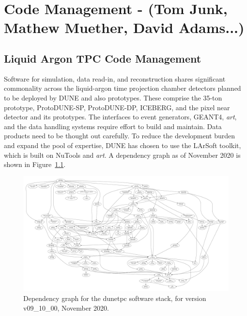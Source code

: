 \chapter{Code Management - (Tom Junk, Mathew Muether, David Adams...)}
\label{ch:codemgmt}

\section{Liquid Argon TPC Code Management}
\label{sec:codemgmt:dunetpc}  %

Software for simulation, data read-in, and reconstruction shares significant commonality across the liquid-argon time projection chamber detectors planned to be deployed by DUNE and also prototypes.  These comprise the 35-ton prototype, ProtoDUNE-SP, ProtoDUNE-DP, ICEBERG, and the pixel near detector and its prototypes.  The interfaces to event generators, GEANT4, {\it art}, and the data handling systems require effort to build and maintain.  Data products need to be thought out carefully.  To reduce the development burden and expand the pool of expertise, DUNE has chosen to use the LArSoft toolkit, which is built on NuTools and {\it art}.  A dependency graph as of November 2020 is shown in Figure~\ref{fig:dunetpcdeptree}.

\begin{figure}[h]
    \centering
\includegraphics[width=\textwidth]{graphics/CodeManagementFigures/dunetpc_v09_10_00_depgraph.pdf}
    \caption{Dependency graph for the dunetpc software stack, for version v09\_10\_00, November 2020.}
    \label{fig:dunetpcdeptree}
\end{figure}

